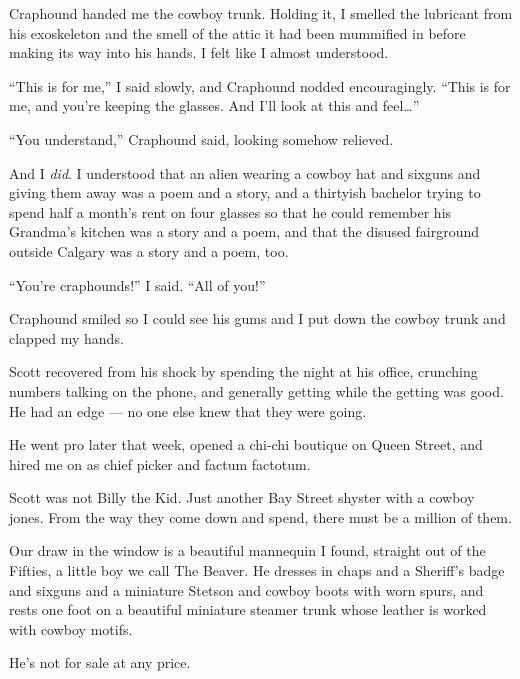 Craphound handed me the cowboy trunk. Holding it, I smelled the
lubricant from his exoskeleton and the smell of the attic it had
been mummified in before making its way into his hands. I felt like
I almost understood.

``This is for me,'' I said slowly, and Craphound nodded
encouragingly.
``This is for me, and you're keeping the glasses. And I'll 
look at this and feel\ldots{}''

``You understand,'' Craphound said, looking somehow relieved.

And I \emph{did}. I understood that an alien wearing a cowboy hat
and sixguns and giving them away was a poem and a story, and a
thirtyish bachelor trying to spend half a month's rent on four
glasses so that he could remember his Grandma's kitchen was a story
and a poem, and that the disused fairground outside Calgary was a
story and a poem, too.

``You're craphounds!'' I said. ``All of you!''

Craphound smiled so I could see his gums and I put down the cowboy
trunk and clapped my hands.

\tb

Scott recovered from his shock by spending the night at his office,
crunching numbers talking on the phone, and generally getting while
the getting was good. He had an edge --- no one else knew that they
were going.

He went pro later that week, opened a chi-chi boutique on Queen
Street, and hired me on as chief picker and factum factotum.

Scott was not Billy the Kid. Just another Bay Street shyster with a
cowboy jones. From the way they come down and spend, there must be
a million of them.

Our draw in the window is a beautiful mannequin I found, straight
out of the Fifties, a little boy we call The Beaver. He dresses in
chaps and a Sheriff's badge and sixguns and a miniature Stetson and
cowboy boots with worn spurs, and rests one foot on a beautiful
miniature steamer trunk whose leather is worked with cowboy
motifs.

He's not for sale at any price.


